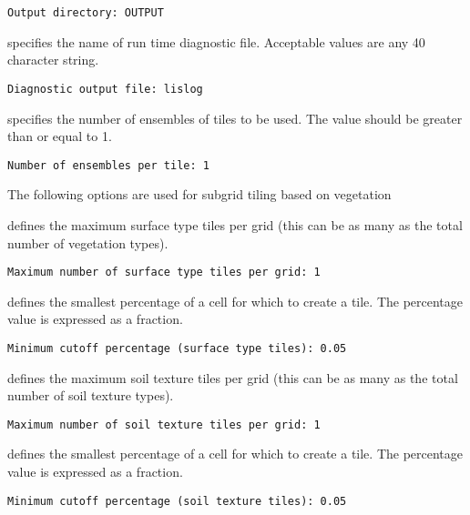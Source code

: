  \begin{Verbatim}[frame=single]
Output directory: OUTPUT
 \end{Verbatim}

 
  specifies the name of run time
 diagnostic file. 
 Acceptable values are any 40 character string.
 

 \begin{Verbatim}[frame=single]
Diagnostic output file: lislog
 \end{Verbatim}

 
  specifies the number of 
 ensembles of tiles to be used. The value should be greater than
 or equal to 1. 
 

 \begin{Verbatim}[frame=single]
Number of ensembles per tile: 1
 \end{Verbatim}

 
 The following options are used for subgrid tiling based on vegetation

  defines the
 maximum surface type tiles per grid (this can be as many as the total
 number of vegetation types). 
 

 \begin{Verbatim}[frame=single]
Maximum number of surface type tiles per grid: 1
 \end{Verbatim}

 
  defines the
 smallest percentage of a cell for which to create a tile.
 The percentage value is expressed as a fraction.
 

 \begin{Verbatim}[frame=single]
Minimum cutoff percentage (surface type tiles): 0.05
 \end{Verbatim}

 
  defines the
 maximum soil texture tiles per grid (this can be as many as the total
 number of soil texture types). 
 

 \begin{Verbatim}[frame=single]
Maximum number of soil texture tiles per grid: 1
 \end{Verbatim}

 
  defines the
 smallest percentage of a cell for which to create a tile.
 The percentage value is expressed as a fraction.
 

 \begin{Verbatim}[frame=single]
Minimum cutoff percentage (soil texture tiles): 0.05
 \end{Verbatim}

